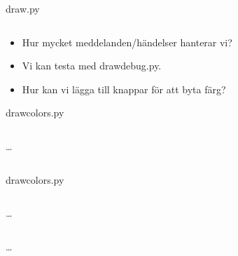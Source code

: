 \begin{frame}[fragile]
  draw.py \hrulefill
  \inputminted[linenos,firstline=24,lastline=40]{python}{examples/draw.py}
\end{frame}

\begin{frame}
  \begin{question}
    \begin{itemize}
      \item Hur mycket meddelanden/händelser hanterar vi?
    \end{itemize}
  \end{question}

  \pause

  \begin{solution}
    \begin{itemize}
      \item Vi kan testa med draw\textunderscore debug.py.
    \end{itemize}
  \end{solution}
\end{frame}

\begin{frame}
  \begin{exercise}
    \begin{itemize}
      \item Hur kan vi lägga till knappar för att byta färg?
    \end{itemize}
  \end{exercise}
\end{frame}

\begin{frame}[fragile]
  draw\textunderscore colors.py \hrulefill
  \inputminted[linenos,firstline=5,lastline=7]{python}{examples/draw_colors.py}
  \dots
  \inputminted[autogobble=false,linenos,firstline=27,lastline=34]{python}{examples/draw_colors.py}
\end{frame}

\begin{frame}[fragile]
  draw\textunderscore colors.py \hrulefill
  \inputminted[autogobble=false,linenos,firstline=40,lastline=40]{python}{examples/draw_colors.py}
  \dots
  \inputminted[autogobble=false,linenos,firstline=49,lastline=52]{python}{examples/draw_colors.py}
  \dots
  \inputminted[autogobble=false,linenos,firstline=58,lastline=60]{python}{examples/draw_colors.py}
\end{frame}
